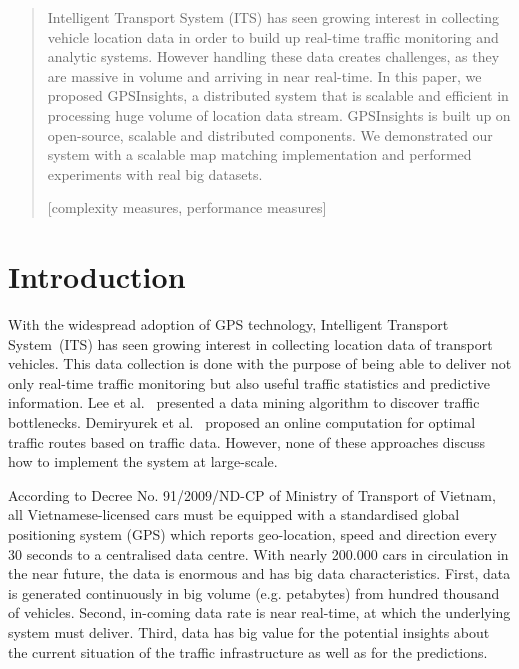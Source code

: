 \documentclass{acm_proc_article-sp}
\begin{document}
\maketitle
\begin{abstract}
Intelligent Transport System (ITS) has seen growing interest in collecting vehicle location data in order to build up real-time traffic monitoring and analytic systems. However handling these data creates challenges, as they are massive in volume and arriving in near real-time. In this paper, we proposed GPSInsights, a distributed system that is scalable and efficient in processing huge volume of location data stream. GPSInsights is built up on open-source, scalable and distributed components. We demonstrated our system with a scalable map matching implementation and performed experiments with real big datasets. 

[complexity measures, performance measures]


\end{abstract}

\section{Introduction}


With the widespread adoption of GPS technology, Intelligent Transport System~(ITS) has seen growing interest in collecting location data of transport vehicles. This data collection is done with the purpose of being able to deliver not only real-time traffic monitoring but also useful traffic statistics and predictive information. Lee et al.~\cite{Lee2011} presented a data mining algorithm to discover traffic bottlenecks. Demiryurek et al.~\cite{Demiryurek2010} proposed an online computation for optimal traffic routes based on traffic data. However, none of these approaches discuss how to implement the system at large-scale.


According to Decree No. 91/2009/ND-CP of Ministry of Transport of Vietnam, all Vietnamese-licensed cars must be equipped with a standardised global positioning system (GPS) which reports geo-location, speed and direction every 30 seconds to a centralised data centre. With nearly 200.000 cars in circulation in the near future, the data is enormous and has big data characteristics. First, data is generated continuously in big volume (e.g. petabytes) from hundred thousand of vehicles. Second, in-coming data rate is near real-time, at which the underlying system must deliver. Third, data has big value for the potential insights about the current situation of the traffic infrastructure as well as for the predictions. 
\end{document}

